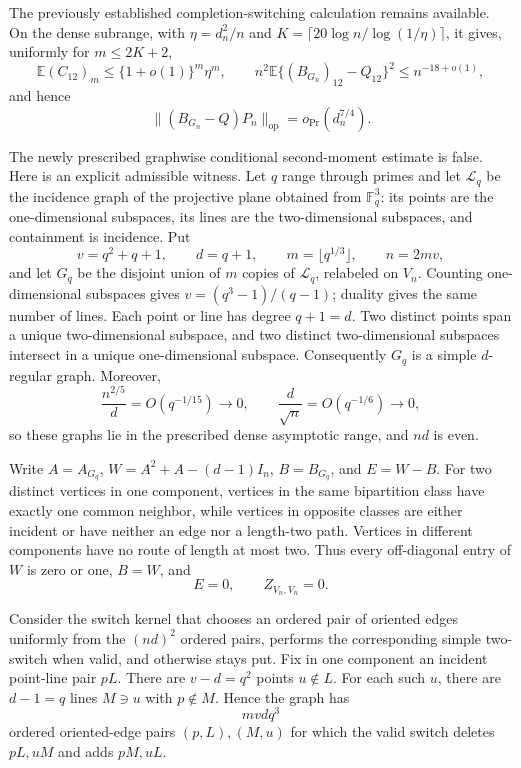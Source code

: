 The previously established completion-switching calculation remains available.  On
the dense subrange, with \(\eta=d_n^2/n\) and
\(K=\lceil20\log n/\log(1/\eta)\rceil\), it gives, uniformly for
\(m\le 2K+2\),
\[
 \mathbb E(C_{12})_m\le \{1+o(1)\}^m\eta^m,
 \qquad
 n^2\mathbb E\{(B_{G_n})_{12}-Q_{12}\}^2
 \le n^{-18+o(1)},
\]
and hence
\[
 \|(B_{G_n}-Q)P_n\|_{\mathrm{op}}=o_{\Pr}(d_n^{7/4}).
\]

The newly prescribed graphwise conditional second-moment estimate is false.  Here
is an explicit admissible witness.  Let \(q\) range through primes and let
\(\mathcal L_q\) be the incidence graph of the projective plane obtained from
\(\mathbb F_q^3\): its points are the one-dimensional subspaces, its lines are the
two-dimensional subspaces, and containment is incidence.  Put
\[
 v=q^2+q+1,\qquad d=q+1,
 \qquad m=\lfloor q^{1/3}\rfloor,
 \qquad n=2mv,
\]
and let \(G_q\) be the disjoint union of \(m\) copies of \(\mathcal L_q\), relabeled
on \(V_n\).  Counting one-dimensional subspaces gives \(v=(q^3-1)/(q-1)\);
duality gives the same number of lines.  Each point or line has degree \(q+1=d\).
Two distinct points span a unique two-dimensional subspace, and two distinct
two-dimensional subspaces intersect in a unique one-dimensional subspace.
Consequently \(G_q\) is a simple \(d\)-regular graph.  Moreover,
\[
 \frac{n^{2/5}}d=O(q^{-1/15})\longrightarrow0,
 \qquad
 \frac d{\sqrt n}=O(q^{-1/6})\longrightarrow0,
\]
so these graphs lie in the prescribed dense asymptotic range, and \(nd\) is even.

Write \(A=A_{G_q}\), \(W=A^2+A-(d-1)I_n\), \(B=B_{G_q}\), and
\(E=W-B\).  For two distinct vertices in one component, vertices in the same
bipartition class have exactly one common neighbor, while vertices in opposite
classes are either incident or have neither an edge nor a length-two path.  Vertices
in different components have no route of length at most two.  Thus every
off-diagonal entry of \(W\) is zero or one, \(B=W\), and
\[
 E=0,
 \qquad Z_{V_n,V_n}=0. \tag{11}
\]

Consider the switch kernel that chooses an ordered pair of oriented edges uniformly
from the \((nd)^2\) ordered pairs, performs the corresponding simple two-switch
when valid, and otherwise stays put.  Fix in one component an incident point-line
pair \(pL\).  There are \(v-d=q^2\) points \(u\notin L\).  For each such \(u\),
there are \(d-1=q\) lines \(M\ni u\) with \(p\notin M\).  Hence the graph has
\[
 mvdq^3
\]
ordered oriented-edge pairs \((p,L),(M,u)\) for which the valid switch deletes
\(pL,uM\) and adds \(pM,uL\).

